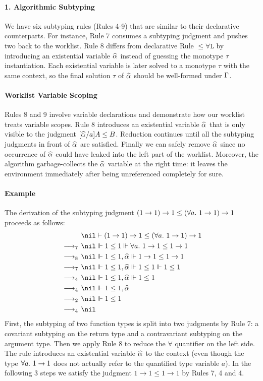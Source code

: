 \paragraph{{\bf 1. Algorithmic Subtyping}}
We have six subtyping rules (Rules 4-9) that are similar to their
declarative counterparts. For instance, Rule 7 consumes a subtyping
judgment and pushes two back to the worklist.  Rule 8 differs from
declarative Rule $\mathtt{{\le}{\forall}L}$ by introducing an existential
variable $\al$ instead of guessing the monotype $\tau$
instantiation. Each existential variable is later solved to a
monotype $\tau$ with the same context, so the final solution $\tau$ of
$\al$ should be well-formed under $\Gamma$.

\paragraph{Worklist Variable Scoping}
Rules 8 and 9 involve variable declarations and demonstrate how our
worklist treats variable scopes. Rule 8 introduces an existential
variable $\al$ that is only visible to the judgment $[\al/a]A \le B$.
Reduction continues until all the subtyping judgments in front of $\al$
are satisfied.  Finally we can safely remove $\al$ since no occurrence
of $\al$ could have leaked into the left part of the worklist.  Moreover,
the algorithm garbage-collects the $\al$
variable at the right time: it leaves the environment immediately
after being unreferenced completely for sure.

\paragraph{Example} The derivation of the subtyping judgment
$(1\to 1)\to 1 \le (\all 1\to 1) \to 1$ proceeds as follows:
\begin{gather*}
\begin{aligned}
  & \nil\vdash (1\to 1)\to 1 \le (\all 1 \to 1) \to 1\\
\rrule{7}  & \nil \Vdash 1 \le 1 \Vdash \all 1 \to 1 \le 1 \to 1\\
\rrule{8}  & \nil \Vdash 1 \le 1 ,\al \Vdash 1 \to 1 \le 1 \to 1\\
\rrule{7}  & \nil \Vdash 1 \le 1 ,\al \Vdash 1 \le 1 \Vdash 1 \le 1\\
\rrule{4} & \nil \Vdash 1 \le 1 ,\al \Vdash 1 \le 1\\
\rrule{4} & \nil \Vdash 1 \le 1 ,\al\\
\rrule{2} & \nil \Vdash 1 \le 1\\
\rrule{4} & \nil
\end{aligned}
\end{gather*}
First, the subtyping of two function types is split into two judgments by Rule 7:
a covariant subtyping on the return type and a contravariant subtyping on the argument type.
Then we apply Rule 8 to reduce the $\forall$ quantifier on the left side.
The rule introduces an existential variable $\al$ to the context (even though 
the type $\all 1 \to 1$ does not actually refer to the quantified type
variable $a$).
In the following 3 steps we satisfy the judgment $1 \to 1 \le 1 \to 1$ by Rules 7, 4 and 4.

